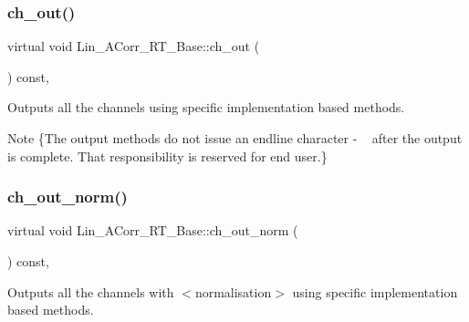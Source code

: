\subsubsection{\texorpdfstring{ch\+\_\+out()}{ch\_out()}}
{\footnotesize\ttfamily virtual void Lin\+\_\+\+A\+Corr\+\_\+\+R\+T\+\_\+\+Base\+::ch\+\_\+out (\begin{DoxyParamCaption}{ }\end{DoxyParamCaption}) const\hspace{0.3cm}{\ttfamily [inline]}, {}}



Outputs all the channels using specific implementation based methods. 

\begin{DoxyNote}{Note}
\{The output methods do not issue an endline character -\/ \textquotesingle{}~\newline
\textquotesingle{} after the output is complete. That responsibility is reserved for end user.\} 
\end{DoxyNote}
\mbox{\label{group__Lin__ACorr__Base__Out_ga3e58cb03c3a93107758d506c53cf2461}} 
\subsubsection{\texorpdfstring{ch\+\_\+out\+\_\+norm()}{ch\_out\_norm()}}
{\footnotesize\ttfamily virtual void Lin\+\_\+\+A\+Corr\+\_\+\+R\+T\+\_\+\+Base\+::ch\+\_\+out\+\_\+norm (\begin{DoxyParamCaption}{ }\end{DoxyParamCaption}) const\hspace{0.3cm}{\ttfamily [inline]}, {}}



Outputs all the channels with {\bfseries } $<$normalisation$>$ using specific implementation based methods. 

